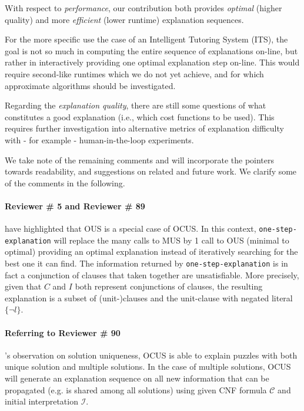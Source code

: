 \documentclass{article}
\begin{document}
With respect to \textit{performance}, our contribution both provides \textit{optimal} (higher quality) and more \textit{efficient} (lower runtime) explanation sequences.

For the more specific use the case of an Intelligent Tutoring System (ITS), the goal is not so much in computing the entire sequence of explanations on-line, but rather in interactively providing one optimal explanation step on-line. %
This would require second-like runtimes which we do not yet achieve, and for which approximate algorithms should be investigated.

Regarding the \textit{explanation quality}, there are still some questions of what constitutes a good explanation (i.e., which cost functions to be used). This requires further investigation into alternative metrics of explanation difficulty with - for example - human-in-the-loop experiments.%

\vspace{2em}
\noindent We take note of the remaining comments and will incorporate the pointers towards readability, and suggestions on related and future work. We clarify some of the comments in the following. 


\paragraph{Reviewer \# 5 and Reviewer \# 89} have highlighted that OUS is a special case of OCUS. In this context, \texttt{one-step-explanation} will replace the many calls to MUS by 1 call to OUS (minimal to optimal) providing an optimal explanation instead of iteratively searching for the best one it can find. 
The information returned by \texttt{one-step-explanation} is in fact a conjunction of clauses that taken together are unsatisfiable. More precisely, given that $C$ and $I$ both represent conjunctions of clauses, the resulting explanation is a subset of (unit-)clauses and the unit-clause with negated literal $\{\lnot l \}$.

\paragraph{Referring to Reviewer \# 90}'s observation on solution uniqueness, OCUS is able to explain puzzles with both unique solution and multiple solutions. In the case of multiple solutions, OCUS will generate an explanation sequence on all new information that can be propagated (e.g. is shared among all solutions) using given CNF formula $\mathcal{C}$ and initial interpretation $\mathcal{I}$.
\end{document}
